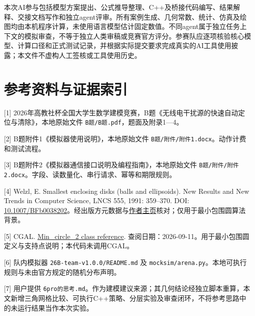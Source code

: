 \documentclass[
  chinese,
  UTF8,
  a4paper,
  zihao=-4]{ctexart}
\begin{document}
本次AI参与包括模型方案提出、公式推导整理、C++及桥接代码编写、结果解释、交接文档写作和独立agent评审。所有案例生成、几何常数、统计、仿真及绘图均由本机程序计算，未使用语言模型估计固定数值。不同agent属于独立任务上下文的模拟审查，不等于独立人类审稿或竞赛官方评分。参赛队应逐项核验核心模型、计算口径和正式测试记录，并根据实际提交要求完成真实的AI工具使用披露；本文件不虚构人工签核或工具使用历史。

\section{参考资料与证据索引}\label{ux53c2ux8003ux8d44ux6599ux4e0eux8bc1ux636eux7d22ux5f15}

{[}1{]}
2026年高教社杯全国大学生数学建模竞赛，B题《无线电干扰源的快速自动定位与清除》，本地原始文件
\texttt{B题/B题.pdf}，题面及附录1---4。

{[}2{]} B题附件1《模拟器使用说明》，本地原始文件
\texttt{B题/附件/附件1.docx}。动作计费和测试流程。

{[}3{]} B题附件2《模拟器通信接口说明及编程指南》，本地原始文件
\texttt{B题/附件/附件2.docx}。字段、读数量化、串行请求、幂等和期限规则。

{[}4{]} Welzl, E. Smallest enclosing disks (balls and ellipsoids). New
Results and New Trends in Computer Science, LNCS 555, 1991: 359--370.
DOI:
\href{https://doi.org/10.1007/BFb0038202}{10.1007/BFb0038202}。经出版方元数据与\href{https://people.inf.ethz.ch/emo/MiscellaneousPubl.html}{作者主页}核对；仅用于最小包围圆算法背景。

{[}5{]} CGAL.
\href{https://doc.cgal.org/latest/Bounding_volumes/classCGAL_1_1Min__circle__2.html}{Min\_circle\_2
class reference}.
查阅日期：2026-09-11。用于最小包围圆定义与支持点说明；本代码未调用CGAL。

{[}6{]} 队内模拟器 \texttt{26B-team-v1.0.0/README.md} 及
\texttt{mocksim/arena.py}。本地可执行规则与未由官方规定的随机分布声明。

{[}7{]} 用户提供
\texttt{6pro的思考.md}。作为建模建议来源；其几何结论经独立脚本重算，本文新增三角网格比较、可执行C++策略、分层实验及审查闭环，不将参考思路中的未运行结果当作本次实验。
\end{document}
